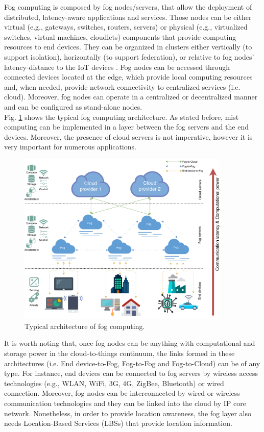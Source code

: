 \noindent\tab Fog computing is composed by fog nodes/servers, that allow the deployment of distributed, latency-aware applications and services. Those nodes can be either virtual (e.g., gateways, switches, routers, servers) or physical (e.g., virtualized switches, virtual machines, cloudlets) components that provide computing resources to end devices. They can be organized in clusters either vertically (to support isolation), horizontally (to support federation), or relative to fog nodes’ latency-distance to the IoT devices \cite{iorga2018fog}. Fog nodes can be accessed through connected devices located at the edge, which provide local computing resources and, when needed, provide network connectivity to centralized services (i.e. cloud). Moreover, fog nodes can operate in a centralized or decentralized manner and can be configured as stand-alone nodes.\\
\noindent\tab Fig. \ref{fog_architecture} shows the typical fog computing architecture. As stated before, mist computing can be implemented in a layer between the fog servers and the end devices. Moreover, the presence of cloud servers is not imperative, however it is very important for numerous applications.
\begin{figure} [t]
	\centering
	\includegraphics[width=0.9\textwidth]{images/fog_architecture/fog_architecture}
	\caption{Typical architecture of fog computing.}
	\label{fog_architecture}
\end{figure}
It is worth noting that, once fog nodes can be anything with computational and storage power in the cloud-to-things continuum, the links formed in these architectures (i.e. End device-to-Fog, Fog-to-Fog and Fog-to-Cloud) can be of any type. For instance, end devices can be connected to fog servers by wireless access technologies (e.g., WLAN, WiFi, 3G, 4G, ZigBee, Bluetooth) or wired connection. Moreover, fog nodes can be interconnected by wired or wireless communication technologies and they can be linked into the cloud by IP core network. Nonetheless, in order to provide location awareness, the fog layer also needs Location-Based Services (LBSs) that provide location information.

